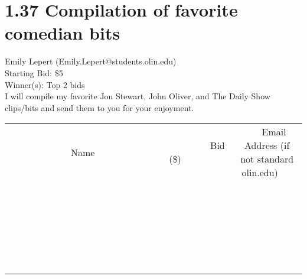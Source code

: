 \documentclass[11pt]{article}
\begin{document}
\section*{1.37 Compilation of favorite comedian bits}
Emily Lepert (Emily.Lepert@students.olin.edu) \\
Starting Bid: \$5 \\
Winner(s): 
Top 2 bids \\
I will compile my favorite Jon Stewart, John Oliver, and The Daily Show clips/bits and send them to you for your enjoyment. \\[6ex]
\begin{tabular}{c c c}
~~~~~~~~~~~~~Name~~~~~~~~~~~~~ & ~~~~~~~~~Bid (\$)~~~~~~~~~ & ~~~Email Address (if not standard olin.edu)~~~ \\
 & & \\
\hline
 & & \\
\hline
 & & \\
\hline
 & & \\
\hline
 & & \\
\hline
 & & \\
\hline
 & & \\
\hline
 & & \\
\hline
 & & \\
\hline
 & & \\
\hline
 & & \\
\hline
 & & \\
\hline
 & & \\
\hline
 & & \\
\hline
 & & \\
\hline
 & & \\
\hline
 & & \\
\hline
 & & \\
\hline
 & & \\
\hline
 & & \\
\hline
 & & \\
\hline
 & & \\
\hline
 & & \\
\hline
 & & \\
\hline
 & & \\
\hline
 & & \\
\hline
\end{tabular}
\clearpage
\end{document}
